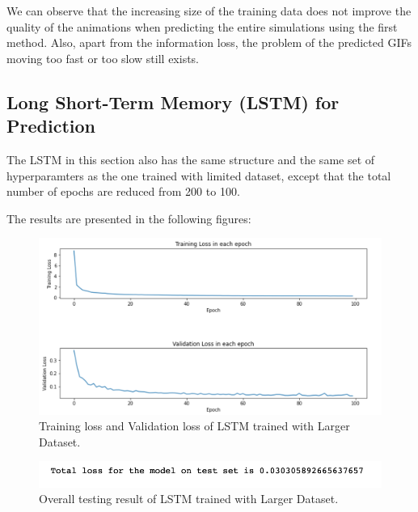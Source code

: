 We can observe that the increasing size of the training data does not improve the quality of the animations when predicting the entire simulations using the first method. Also, apart from the information loss, the problem of the predicted GIFs moving too fast or too slow still exists.


\subsection{Long Short-Term Memory (LSTM) for Prediction}

The LSTM in this section also has the same structure and the same set of hyperparamters as the one trained with limited dataset, except that the total number of epochs are reduced from 200 to 100.

The results are presented in the following figures:

\begin{figure}[H]
    \caption{Training loss and Validation loss of LSTM trained with Larger Dataset.}
    \includegraphics[scale=0.6]{figures/mantle_convection_images/larger_dataset/LSTM_trainingData.png}
\end{figure}

\begin{figure}[H]
    \caption{Overall testing result of LSTM trained with Larger Dataset.}
    \includegraphics[scale=0.8]{figures/mantle_convection_images/larger_dataset/LSTM_OverallTesting.png}
\end{figure}

